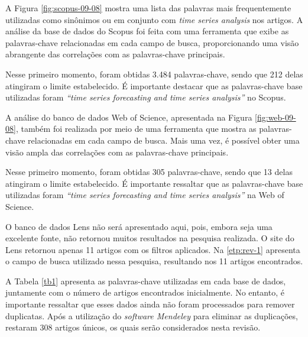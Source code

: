 A Figura \ref{fig:scopus-09-08} mostra uma lista das palavras mais frequentemente utilizadas como sinônimos ou em conjunto com \textit{time series analysis} nos artigos. A análise da base de dados do Scopus foi feita com uma ferramenta que exibe as palavras-chave relacionadas em cada campo de busca, proporcionando uma visão abrangente das correlações com as palavras-chave principais.

Nesse primeiro momento, foram obtidas 3.484 palavras-chave, sendo que 212 delas atingiram o limite estabelecido. É importante destacar que as palavras-chave base utilizadas foram \textit{``time series forecasting and time series analysis''} no Scopus.



A análise do banco de dados Web of Science, apresentada na Figura \ref{fig:web-09-08}, também foi realizada por meio de uma ferramenta que mostra as palavras-chave relacionadas em cada campo de busca. Mais uma vez, é possível obter uma visão ampla das correlações com as palavras-chave principais.

Nesse primeiro momento, foram obtidas 305 palavras-chave, sendo que 13 delas atingiram o limite estabelecido. É importante ressaltar que as palavras-chave base utilizadas foram \textit{``time series forecasting and time series analysis''} na Web of Science.

O banco de dados Lens não será apresentado aqui, pois, embora seja uma excelente fonte, não retornou muitos resultados na pesquisa realizada. O site do Lens retornou apenas 11 artigos com os filtros aplicados. Na \ref{etp:rev-1} apresenta o campo de busca utilizado nessa pesquisa, resultando nos 11 artigos encontrados.





A Tabela \ref{tb1} apresenta as palavras-chave utilizadas em cada base de dados, juntamente com o número de artigos encontrados inicialmente. No entanto, é importante ressaltar que esses dados ainda não foram processados para remover duplicatas. Após a utilização do \textit{software Mendeley} para eliminar as duplicações, restaram 308 artigos únicos, os quais serão considerados nesta revisão.






